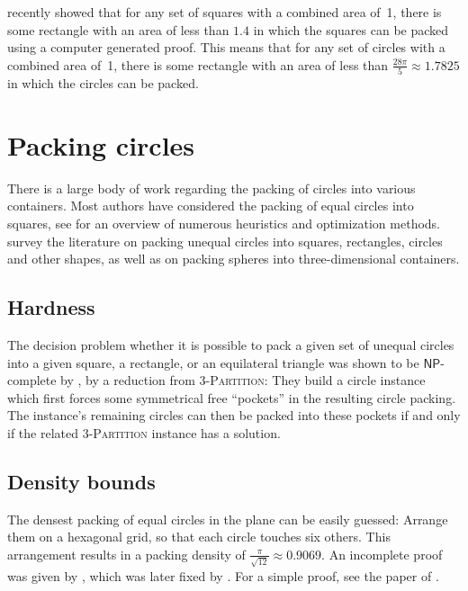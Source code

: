 \documentclass[a4paper,style=print,bibliography=totoc,nexus,lnum,extramargin]{tubsbook}
\begin{document}
\textcite{hougardy2011packing} recently showed that for any set of squares with a combined area of~1, there is some rectangle with an area of less than $1.4$ in which the squares can be packed using a computer generated proof. This means that for any set of circles with a combined area of~1, there is some rectangle with an area of less than $\frac{28\pi}{5} \approx 1.7825$ in which the circles can be packed.

\section{Packing circles}

There is a large body of work regarding the packing of circles into various containers. Most authors have considered the packing of equal circles into squares, see \textcite{SMCSCG2007new} for an overview of numerous heuristics and optimization methods. \textcite{HM2009literature} survey the literature on packing unequal circles into squares, rectangles, circles and other shapes, as well as on packing spheres into three-dimensional containers.

\subsection{Hardness}

The decision problem whether it is possible to pack a given set of unequal circles into a given square, a rectangle, or an equilateral triangle was shown to be $\mathsf{NP}$-complete by \textcite{DFL2010circle}, by a reduction from \textsc{3-Partition}: They build a circle instance which first forces some symmetrical free “pockets” in the resulting circle packing. The instance's remaining circles can then be packed into these pockets if and only if the related \textsc{3-Partition} instance has a solution.

\subsection{Density bounds}

The densest packing of equal circles in the plane can be easily guessed: Arrange them on a hexagonal grid, so that each circle touches six others. This arrangement results in a packing density of $\frac{\pi}{\sqrt{12}} \approx 0.9069$. An incomplete proof was given by \textcite{thue1892om}, which was later fixed by \textcite{fejestoth1940uber}. For a simple proof, see the paper of \textcite{CW2010simple}.
\end{document}
